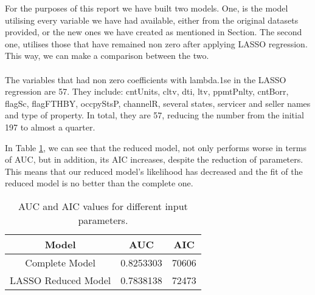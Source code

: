 For the purposes of this report we have built two models. One, is the model 
utilising every variable we have had available, either from the original 
datasets provided, or the new ones we have created as mentioned in Section. 
The second one, utilises those that have remained non zero after applying 
LASSO regression. This way, we can make a comparison between the two.
\\\\
The variables that had non zero coefficients with lambda.1se in the LASSO 
regression are 57. They include: cntUnits, cltv, dti, ltv, ppmtPnlty, 
cntBorr, flagSc, flagFTHBY, occpyStsP, channelR, several states, servicer 
and seller names and type of property. In total, they are 57, reducing the 
number from the initial 197 to almost a quarter. 


    
In Table \ref{ModelAICandAUC}, we can see that the reduced model, not only 
performs worse in terms of AUC, but in addition, its AIC increases, 
despite the reduction of parameters. This means that our reduced model's 
likelihood has decreased and the fit of the reduced model is no better 
than the complete one.
    
\begin{table}[H]
    \centering
        \begin{tabular}{c|c|c}
        Model & AUC & AIC \\\hline
        Complete Model & 0.8253303 & 70606\\
        LASSO Reduced Model &  0.7838138 & 72473\\
        
	    \end{tabular}
        \caption{AUC and AIC values for different input parameters.}
        \label{ModelAICandAUC}
\end{table}
